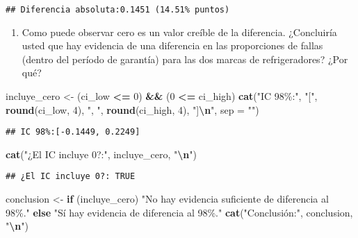 \documentclass[
]{article}
\newenvironment{Shaded}{\begin{snugshade}}{\end{snugshade}}
\newcommand{\AttributeTok}[1]{\textcolor[rgb]{0.13,0.29,0.53}{#1}}
\newcommand{\ControlFlowTok}[1]{\textcolor[rgb]{0.13,0.29,0.53}{\textbf{#1}}}
\newcommand{\DecValTok}[1]{\textcolor[rgb]{0.00,0.00,0.81}{#1}}
\newcommand{\FunctionTok}[1]{\textcolor[rgb]{0.13,0.29,0.53}{\textbf{#1}}}
\newcommand{\NormalTok}[1]{#1}
\newcommand{\OtherTok}[1]{\textcolor[rgb]{0.56,0.35,0.01}{#1}}
\newcommand{\SpecialCharTok}[1]{\textcolor[rgb]{0.81,0.36,0.00}{\textbf{#1}}}
\newcommand{\StringTok}[1]{\textcolor[rgb]{0.31,0.60,0.02}{#1}}
\providecommand{\tightlist}{%
  \setlength{\itemsep}{0pt}\setlength{\parskip}{0pt}}
\begin{document}
\begin{verbatim}
## Diferencia absoluta:0.1451 (14.51% puntos)
\end{verbatim}

\begin{enumerate}
\def\labelenumi{\alph{enumi})}
\setcounter{enumi}{5}
\tightlist
\item
  Como puede observar cero es un valor creíble de la diferencia.
  ¿Concluiría usted que hay evidencia de una diferencia en las
  proporciones de fallas (dentro del período de garantía) para las dos
  marcas de refrigeradores? ¿Por qué?
\end{enumerate}

\begin{Shaded}
\begin{Highlighting}[]
\NormalTok{incluye\_cero }\OtherTok{\textless{}{-}}\NormalTok{ (ci\_low }\SpecialCharTok{\textless{}=} \DecValTok{0}\NormalTok{) }\SpecialCharTok{\&\&}\NormalTok{ (}\DecValTok{0} \SpecialCharTok{\textless{}=}\NormalTok{ ci\_high)}
\FunctionTok{cat}\NormalTok{(}\StringTok{"IC 98\%:"}\NormalTok{, }\StringTok{"["}\NormalTok{, }\FunctionTok{round}\NormalTok{(ci\_low, }\DecValTok{4}\NormalTok{), }\StringTok{", "}\NormalTok{, }\FunctionTok{round}\NormalTok{(ci\_high, }\DecValTok{4}\NormalTok{), }\StringTok{"]}\SpecialCharTok{\textbackslash{}n}\StringTok{"}\NormalTok{, }\AttributeTok{sep =} \StringTok{""}\NormalTok{)}
\end{Highlighting}
\end{Shaded}

\begin{verbatim}
## IC 98%:[-0.1449, 0.2249]
\end{verbatim}

\begin{Shaded}
\begin{Highlighting}[]
\FunctionTok{cat}\NormalTok{(}\StringTok{"¿El IC incluye 0?:"}\NormalTok{, incluye\_cero, }\StringTok{"}\SpecialCharTok{\textbackslash{}n}\StringTok{"}\NormalTok{)}
\end{Highlighting}
\end{Shaded}

\begin{verbatim}
## ¿El IC incluye 0?: TRUE
\end{verbatim}

\begin{Shaded}
\begin{Highlighting}[]
\NormalTok{conclusion }\OtherTok{\textless{}{-}} \ControlFlowTok{if}\NormalTok{ (incluye\_cero) }\StringTok{"No hay evidencia suficiente de diferencia al 98\%."} \ControlFlowTok{else} \StringTok{"Sí hay evidencia de diferencia al 98\%."}
\FunctionTok{cat}\NormalTok{(}\StringTok{"Conclusión:"}\NormalTok{, conclusion, }\StringTok{"}\SpecialCharTok{\textbackslash{}n}\StringTok{"}\NormalTok{)}
\end{Highlighting}
\end{Shaded}
\end{document}
